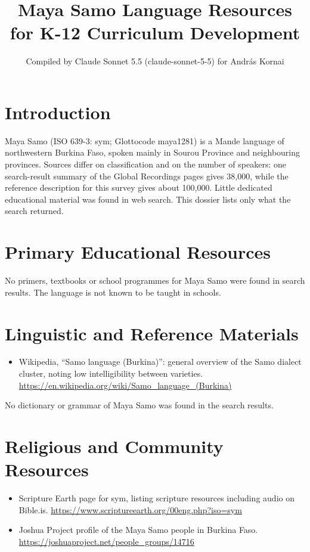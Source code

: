 \documentclass[12pt]{article}
\title{Maya Samo Language Resources for K-12 Curriculum Development}
\author{Compiled by Claude Sonnet 5.5 (claude-sonnet-5-5) for Andr\'as Kornai}
\date{}
\begin{document}
\maketitle

\section{Introduction}
Maya Samo (ISO 639-3: sym; Glottocode maya1281) is a Mande language of northwestern Burkina Faso, spoken mainly in Sourou Province and neighbouring provinces. Sources differ on classification and on the number of speakers: one search-result summary of the Global Recordings pages gives 38,000, while the reference description for this survey gives about 100,000. Little dedicated educational material was found in web search. This dossier lists only what the search returned.

\section{Primary Educational Resources}
No primers, textbooks or school programmes for Maya Samo were found in search results. The language is not known to be taught in schools.

\section{Linguistic and Reference Materials}
\begin{itemize}
\item Wikipedia, ``Samo language (Burkina)'': general overview of the Samo dialect cluster, noting low intelligibility between varieties. \url{https://en.wikipedia.org/wiki/Samo_language_(Burkina)}
\end{itemize}
No dictionary or grammar of Maya Samo was found in the search results.

\section{Religious and Community Resources}
\begin{itemize}
\item Scripture Earth page for sym, listing scripture resources including audio on Bible.is. \url{https://www.scriptureearth.org/00eng.php?iso=sym}
\item Joshua Project profile of the Maya Samo people in Burkina Faso. \url{https://joshuaproject.net/people_groups/14716}
\end{itemize}
\end{document}
